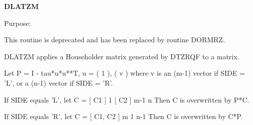{\bfseries D\+L\+A\+T\+Z\+M} 

 \begin{DoxyParagraph}{Purpose\+: }
\begin{DoxyVerb} This routine is deprecated and has been replaced by routine DORMRZ.

 DLATZM applies a Householder matrix generated by DTZRQF to a matrix.

 Let P = I - tau*u*u**T,   u = ( 1 ),
                               ( v )
 where v is an (m-1) vector if SIDE = 'L', or a (n-1) vector if
 SIDE = 'R'.

 If SIDE equals 'L', let
        C = [ C1 ] 1
            [ C2 ] m-1
              n
 Then C is overwritten by P*C.

 If SIDE equals 'R', let
        C = [ C1, C2 ] m
               1  n-1
 Then C is overwritten by C*P.\end{DoxyVerb}
 
\end{DoxyParagraph}

